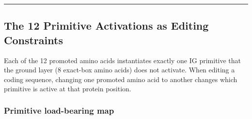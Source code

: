 \documentclass[12pt,a4paper]{article}
\begin{document}
\begin{center}
\rule{0.5\textwidth}{0.4pt}
\end{center}

\subsection{The 12 Primitive Activations as Editing Constraints}

Each of the 12 promoted amino acids instantiates exactly one IG primitive that the ground layer (8 exact-box amino acids) does not activate. When editing a coding sequence, changing one promoted amino acid to another changes which primitive is active at that protein position.

\subsubsection{Primitive load-bearing map}
\end{document}
